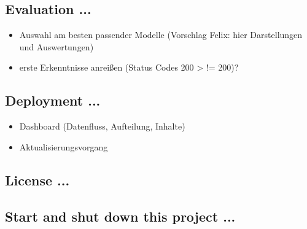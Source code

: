 \subsection{Evaluation ...}\label{subsec:evaluation}
\begin{itemize}
    \item Auswahl am besten passender Modelle (Vorschlag Felix: hier Darstellungen und Auswertungen)
    \item erste Erkenntnisse anreißen (Status Codes 200 > != 200)?
\end{itemize}


\subsection{Deployment ...}\label{subsec:deployment}
\begin{itemize}
    \item Dashboard (Datenfluss, Aufteilung, Inhalte)
    \item Aktualisierungsvorgang
\end{itemize}

\subsection{License ...}\label{subsec:license}

\subsection{Start and shut down this project ...}\label{subsec:start-and-shut-down-this-project-...}
